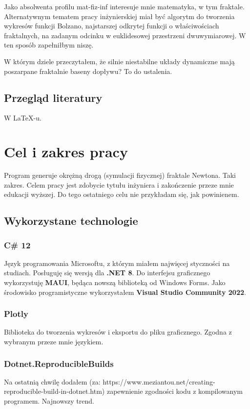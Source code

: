 \documentclass{SGGW-thesis}
\begin{document}
Jako absolwenta profilu mat-fiz-inf interesuje mnie matematyka, w tym fraktale. Alternatywnym tematem pracy inżynierskiej miał być algorytm do tworzenia wykresów funkcji Bolzano, najstarszej odkrytej funkcji o właściwościach fraktalnych, na zadanym odcinku w euklidesowej przestrzeni dwuwymiarowej. W ten sposób zapełniłbym niszę.

W którym dziele przeczytałem, że silnie niestabilne układy dynamiczne mają poszarpane fraktalnie baseny dopływu? To do ustalenia. 

\section{Przegląd literatury}
W \LaTeX-u.\cite{talbot2013}

\chapter{Cel i zakres pracy}
Program generuje okrężną drogą (symulacji fizycznej) fraktale Newtona. Taki zakres. Celem pracy jest zdobycie tytułu inżyniera i zakończenie przeze mnie edukacji wyższej. Do tego ostatniego celu nie przykładam się, jak powinienem.
\section{Wykorzystane technologie}

\subsection{C\# 12}
Język programowania Microsoftu, z którym miałem najwięcej styczności na studiach. Posługuję się wersją dla \textbf{.NET 8}. Do interfejsu graficznego wykorzystuję \textbf{MAUI}, będąca nowszą biblioteką od Windows Forms. Jako środowisko programistyczne wykorzystałem \textbf{Visual Studio Community 2022}.
\subsection{Plotly}
Biblioteka do tworzenia wykresów i eksportu do pliku graficznego. Zgodna z wybranym przeze mnie językiem.
\subsection{Dotnet.ReproducibleBuilds}
Na ostatnią chwilę dodałem  (za: https://www.meziantou.net/creating-reproducible-build-in-dotnet.htm) zapewnienie zgodności kodu z kompilowanym programem. Najnowszy trend.
\end{document}
